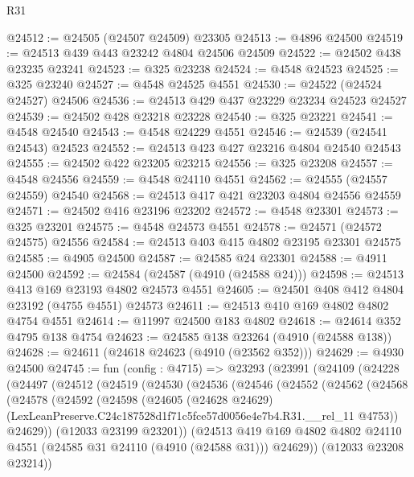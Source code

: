 \begin{lexlean}{R31}
\begin{coremodule}
@24512 := @24505 (@24507 @24509) @23305
@24513 := @4896 @24500
@24519 := @24513 @439 @443 @23242 @4804 @24506 @24509
@24522 := @24502 @438 @23235 @23241
@24523 := @325 @23238
@24524 := @4548 @24523
@24525 := @325 @23240
@24527 := @4548 @24525 @4551
@24530 := @24522 (@24524 @24527) @24506
@24536 := @24513 @429 @437 @23229 @23234 @24523 @24527
@24539 := @24502 @428 @23218 @23228
@24540 := @325 @23221
@24541 := @4548 @24540
@24543 := @4548 @24229 @4551
@24546 := @24539 (@24541 @24543) @24523
@24552 := @24513 @423 @427 @23216 @4804 @24540 @24543
@24555 := @24502 @422 @23205 @23215
@24556 := @325 @23208
@24557 := @4548 @24556
@24559 := @4548 @24110 @4551
@24562 := @24555 (@24557 @24559) @24540
@24568 := @24513 @417 @421 @23203 @4804 @24556 @24559
@24571 := @24502 @416 @23196 @23202
@24572 := @4548 @23301
@24573 := @325 @23201
@24575 := @4548 @24573 @4551
@24578 := @24571 (@24572 @24575) @24556
@24584 := @24513 @403 @415 @4802 @23195 @23301 @24575
@24585 := @4905 @24500
@24587 := @24585 @24 @23301
@24588 := @4911 @24500
@24592 := @24584 (@24587 (@4910 (@24588 @24)))
@24598 := @24513 @413 @169 @23193 @4802 @24573 @4551
@24605 := @24501 @408 @412 @4804 @23192 (@4755 @4551) @24573
@24611 := @24513 @410 @169 @4802 @4802 @4754 @4551
@24614 := @11997 @24500 @183 @4802
@24618 := @24614 @352 @4795 @138 @4754
@24623 := @24585 @138 @23264 (@4910 (@24588 @138))
@24628 := @24611 (@24618 @24623 (@4910 (@23562 @352)))
@24629 := @4930 @24500
@24745 := fun (config : @4715) =>
  @23293
    (@23991
      (@24109
        (@24228
          (@24497
            (@24512
              (@24519
                (@24530
                  (@24536
                    (@24546
                      (@24552
                        (@24562
                          (@24568
                            (@24578
                              (@24592
                                (@24598
                                  (@24605
                                    (@24628 @24629)
                                    (LexLeanPreserve.C24c187528d1f71c5fce57d0056e4e7b4.R31.__rel_11
                                      @4753))
                                  @24629))
                              (@12033 @23199 @23201))
                            (@24513
                              @419
                              @169
                              @4802
                              @4802
                              @24110
                              @4551
                              (@24585 @31 @24110 (@4910 (@24588 @31)))
                              @24629))
                          (@12033 @23208 @23214))

\end{coremodule}
\end{lexlean}
